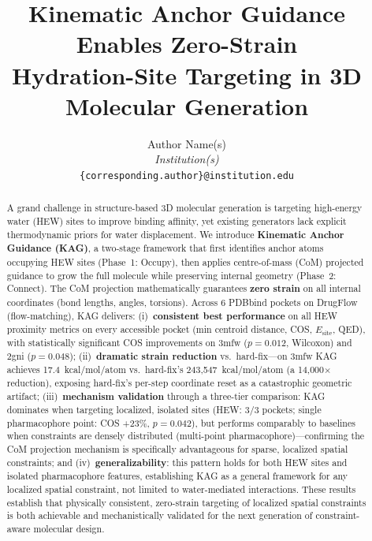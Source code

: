 \documentclass{article}
\title{\Large\bfseries Kinematic Anchor Guidance Enables Zero-Strain\\
       Hydration-Site Targeting in 3D Molecular Generation}
\author{Author Name(s)\\[4pt]
        \small\textit{Institution(s)}\\[4pt]
        \small\texttt{\{corresponding.author\}@institution.edu}}
\date{}
\begin{document}
\maketitle

\begin{abstract}
A grand challenge in structure-based 3D molecular generation is targeting
high-energy water (HEW) sites to improve binding affinity, yet existing
generators lack explicit thermodynamic priors for water displacement.
We introduce \textbf{Kinematic Anchor Guidance (KAG)}, a two-stage
framework that first identifies anchor atoms occupying HEW sites
(Phase~1: Occupy), then applies centre-of-mass (CoM) projected guidance
to grow the full molecule while preserving internal geometry
(Phase~2: Connect).  The CoM projection mathematically guarantees
\textbf{zero strain} on all internal coordinates (bond lengths, angles,
torsions).  Across 6 PDBbind pockets on DrugFlow (flow-matching),
KAG delivers:
(i)~\textbf{consistent best performance} on all HEW proximity metrics
on every accessible pocket (min centroid distance, COS, $E_{\text{site}}$,
QED), with statistically significant COS improvements on 3mfw ($p=0.012$,
Wilcoxon) and 2gni ($p=0.048$);
(ii)~\textbf{dramatic strain reduction} vs.\ hard-fix---on 3mfw KAG
achieves 17.4~kcal/mol/atom vs.\ hard-fix's 243,547~kcal/mol/atom
(a 14,000$\times$ reduction), exposing hard-fix's per-step coordinate
reset as a catastrophic geometric artifact;
(iii)~\textbf{mechanism validation} through a three-tier comparison:
KAG dominates when targeting localized, isolated sites (HEW: 3/3 pockets;
single pharmacophore point: COS +23\%, $p=0.042$), but performs
comparably to baselines when constraints are densely distributed
(multi-point pharmacophore)---confirming the CoM projection mechanism
is specifically advantageous for sparse, localized spatial constraints;
and (iv)~\textbf{generalizability}: this pattern holds for both HEW
sites and isolated pharmacophore features, establishing KAG as a
general framework for any localized spatial constraint, not limited
to water-mediated interactions.
These results establish that physically consistent, zero-strain
targeting of localized spatial constraints is both achievable and
mechanistically validated for the next generation of
constraint-aware molecular design.
\end{abstract}

\end{document}
